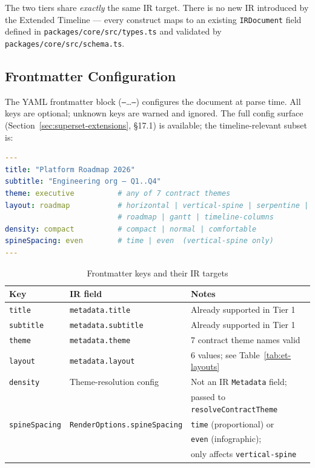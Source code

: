 The two tiers share \emph{exactly} the same IR target.  There is no new IR
introduced by the Extended Timeline --- every construct maps to an existing
\texttt{IRDocument} field defined in \texttt{packages/core/src/types.ts} and
validated by \texttt{packages/core/src/schema.ts}.

\subsection{Frontmatter Configuration}
\label{sec:et-frontmatter}

The YAML frontmatter block (\texttt{---}\ldots\texttt{---}) configures the
document at parse time.  All keys are optional; unknown keys are warned and
ignored.  The full config surface (Section~\ref{sec:superset-extensions},
\S17.1) is available; the timeline-relevant subset is:

\begin{lstlisting}[language=yaml,caption={Extended timeline frontmatter}]
---
title: "Platform Roadmap 2026"
subtitle: "Engineering org — Q1..Q4"
theme: executive          # any of 7 contract themes
layout: roadmap           # horizontal | vertical-spine | serpentine |
                          # roadmap | gantt | timeline-columns
density: compact          # compact | normal | comfortable
spineSpacing: even        # time | even  (vertical-spine only)
---
\end{lstlisting}

\begin{table}[h]
\centering\small
\caption{Frontmatter keys and their IR targets}
\label{tab:et-frontmatter}
\begin{tabular}{lll}
\toprule
\textbf{Key} & \textbf{IR field} & \textbf{Notes} \\
\midrule
\texttt{title}       & \texttt{metadata.title}        & Already supported in Tier 1 \\
\texttt{subtitle}    & \texttt{metadata.subtitle}     & Already supported in Tier 1 \\
\texttt{theme}       & \texttt{metadata.theme}        & 7 contract theme names valid \\
\texttt{layout}      & \texttt{metadata.layout}       & 6 values; see Table~\ref{tab:et-layouts} \\
\texttt{density}     & Theme-resolution config        & Not an IR \texttt{Metadata} field; \\
                     &                                & passed to \texttt{resolveContractTheme} \\
\texttt{spineSpacing}& \texttt{RenderOptions.spineSpacing} & \texttt{time} (proportional) or \\
                     &                                & \texttt{even} (infographic); \\
                     &                                & only affects \texttt{vertical-spine} \\
\bottomrule
\end{tabular}
\end{table}

